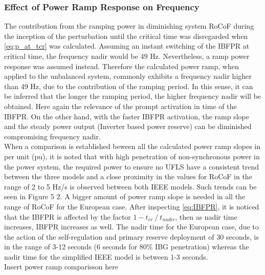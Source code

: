 \subsubsection{Effect of Power Ramp Response on Frequency}

The contribution from the ramping power in diminishing system RoCoF during the inception of the perturbation until the critical time was disregarded when \ref{eq:p_at_tcr} was calculated. Assuming an instant switching of the IBFPR at critical time, the frequency nadir would be 49 Hz. Nevertheless, a ramp power response was assumed instead. Therefore the calculated power ramp, when applied to the unbalanced system, commonly exhibits a frequency nadir higher than 49 Hz, due to the contribution of the ramping period. In this sense, it can be inferred that the longer the ramping period, the higher frequency nadir will be obtained. Here again the relevance of the prompt activation in time of the IBFPR. On the other hand, with the faster IBFPR activation, the ramp slope and the steady power output (Inverter based power reserve) can be diminished compromising frequency nadir.\\ %
When a comparison is established beween all the calculated power ramp slopes in per unit  (pu), it is noted that with high penetration of non-synchronous power in the power system, the required power to ensure no UFLS have a consistent trend between the three models and a close proximity in the values for RoCoF in the range of 2 to 5 Hz/s is observed between both IEEE models. Such trends can be seen in Figure 5 2. A bigger amount of power ramp slope is needed in all the range of RoCoF for the European case. After inspecting \ref{eq:IBFPR}, it is noticed that the IBFPR is affected by the factor $ 1-t_{cr}⁄t_{nadir} $, then as nadir time increases, IBFPR increases as well. The nadir time for the European case, due to the action of the self-regulation and primary reserve deployment of 30 seconds, is in the range of 3-12 seconds (6 seconds for 80\% IBG penetration) whereas the nadir time for the simplified IEEE model is between 1-3 seconds.\\

Insert power ramp comparisson here

